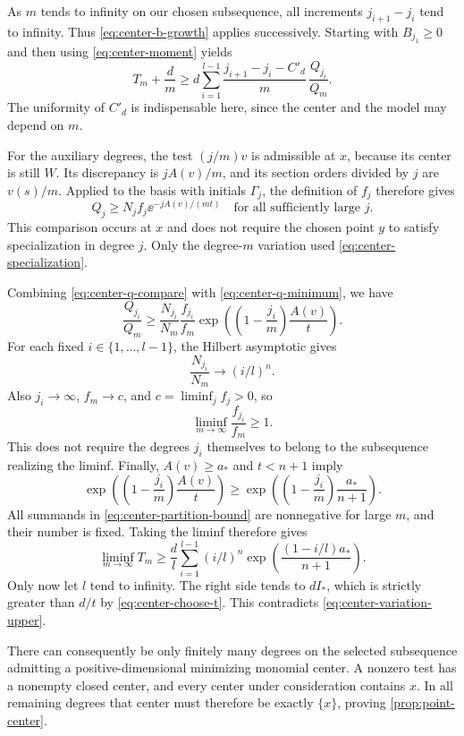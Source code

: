 As $m$ tends to infinity on our chosen subsequence, all increments $j_{i+1}-j_i$ tend to infinity. Thus \eqref{eq:center-b-growth} applies successively. Starting with $B_{j_1}\ge0$ and then using \eqref{eq:center-moment} yields
\begin{equation}\label{eq:center-partition-bound}
 T_m+\frac dm
 \ge d\sum_{i=1}^{l-1}
       \frac{j_{i+1}-j_i-C'_d}{m}\,
       \frac{Q_{j_i}}{Q_m}.
\end{equation}
The uniformity of $C'_d$ is indispensable here, since the center and the model may depend on $m$.

For the auxiliary degrees, the test $(j/m)v$ is admissible at $x$, because its center is still $W$. Its discrepancy is $j{A}(v)/m$, and its section orders divided by $j$ are $v(s)/m$. Applied to the basis with initials $\Gamma_j$, the definition of $f_j$ therefore gives
\begin{equation}\label{eq:center-q-compare}
 Q_j\ge N_j f_j \ee^{-j{A}(v)/(mt)}
 \quad\text{for all sufficiently large }j.
\end{equation}
This comparison occurs at $x$ and does not require the chosen point $y$ to satisfy specialization in degree $j$. Only the degree-$m$ variation used \eqref{eq:center-specialization}.

Combining \eqref{eq:center-q-compare} with \eqref{eq:center-q-minimum}, we have
\begin{equation}\label{eq:center-ratio}
 \frac{Q_{j_i}}{Q_m}
 \ge\frac{N_{j_i}}{N_m}\frac{f_{j_i}}{f_m}
      \exp\!\left(\left(1-\frac{j_i}{m}\right)
                         \frac{{A}(v)}{t}\right).
\end{equation}
For each fixed $i\in\{1,\ldots,l-1\}$, the Hilbert asymptotic gives
\[
 \frac{N_{j_i}}{N_m}\longrightarrow(i/l)^n.
\]
Also $j_i\to\infty$, $f_m\to c$, and $c=\liminf_j f_j>0$, so
\[
 \liminf_{m\to\infty}\frac{f_{j_i}}{f_m}\ge1.
\]
This does not require the degrees $j_i$ themselves to belong to the subsequence realizing the liminf. Finally, ${A}(v)\ge a_*$ and $t<n+1$ imply
\[
 \exp\!\left(\left(1-\frac{j_i}{m}\right)
                         \frac{{A}(v)}{t}\right)
 \ge
 \exp\!\left(\left(1-\frac{j_i}{m}\right)
                         \frac{a_*}{n+1}\right).
\]
All summands in \eqref{eq:center-partition-bound} are nonnegative for large $m$, and their number is fixed. Taking the liminf therefore gives
\begin{equation}\label{eq:center-riemann-lower}
 \liminf_{m\to\infty}T_m
 \ge \frac dl\sum_{i=1}^{l-1}(i/l)^n
               \exp\!\left(\frac{(1-i/l)a_*}{n+1}\right).
\end{equation}
Only now let $l$ tend to infinity. The right side tends to $dI_*$, which is strictly greater than $d/t$ by \eqref{eq:center-choose-t}. This contradicts \eqref{eq:center-variation-upper}.

There can consequently be only finitely many degrees on the selected subsequence admitting a positive-dimensional minimizing monomial center. A nonzero test has a nonempty closed center, and every center under consideration contains $x$. In all remaining degrees that center must therefore be exactly $\{x\}$, proving \cref{prop:point-center}.
